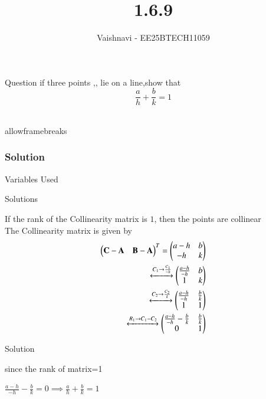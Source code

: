 \documentclass{beamer}
\title %
{1.6.9}
\author %
{Vaishnavi - EE25BTECH11059}
\begin{document}
\frame{\titlepage}
\begin{frame}{Question}
if three points ,, lie on a line,show that
\[
\frac{a}{h} + \frac{b}{k} = 1
\]
\\
 

\end{frame}
\begin{frame}{allowframebreaks}
\frametitle{Solution}
\begin{table}[H]    
  \centering
  
  \caption{Variables Used}
  \label{tab:1.6.9}
\end{table}

\end{frame}
\begin{frame}{Solutions}

If the rank of the Collinearity matrix is $1$, then the points are collinear\\
   The Collinearity matrix is given by\\
\begin{align}
    \begin{pmatrix}
    \mathbf{C}-\mathbf{A} & \mathbf{B}-\mathbf{A}
  \end{pmatrix}^T = \begin{pmatrix}
    a-h & b
    \\
    -h & k
    \end{pmatrix}\\
  \xleftrightarrow[]{C_1 \rightarrow {\frac{C_1}{-h}}}
 \begin{pmatrix}
    \frac{a-h}{-h} & b
    \\
    1 & k
    \end{pmatrix}\\
     \xleftrightarrow[]{C_2 \rightarrow {\frac{C_2}{k}}}
 \begin{pmatrix}
    \frac{a-h}{-h} & \frac{b}{k}
    \\
     1 & 1
    \end{pmatrix}\\
       \xleftrightarrow[]{R_1 \rightarrow C_1- C_2}
 \begin{pmatrix}
    \frac{a-h}{-h}-\frac{b}{k} & \frac{b}{k} 
    \\
    0 & 1
      \end{pmatrix} 
\end{align}

\end{frame}


\begin{frame}{Solution}
    
since the rank of matrix=1
\begin{center}

$\frac{a-h}{-h}-\frac{b}{k}=0 \implies \frac{a}{h}+\frac{b}{k}=1$
\end{center}
\end{frame}
\end{document}
